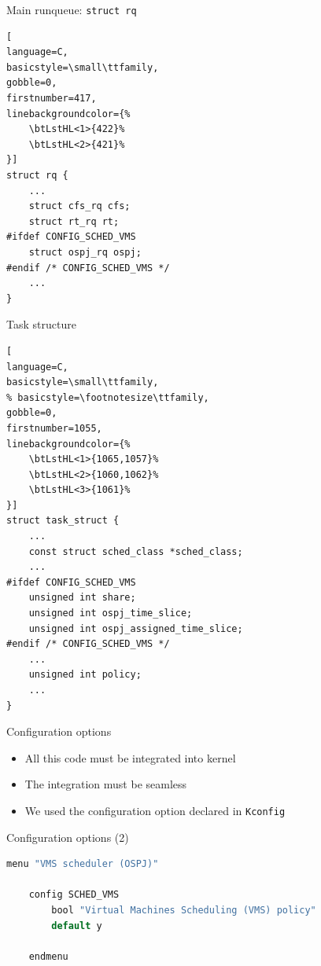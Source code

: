 \begin{frame}[fragile]{Main runqueue: \texttt{struct rq}}
\begin{lstlisting}[
language=C,
basicstyle=\small\ttfamily,
gobble=0,
firstnumber=417,
linebackgroundcolor={%
    \btLstHL<1>{422}%
    \btLstHL<2>{421}%
}]
struct rq {
    ...
    struct cfs_rq cfs;
    struct rt_rq rt;
#ifdef CONFIG_SCHED_VMS
    struct ospj_rq ospj;
#endif /* CONFIG_SCHED_VMS */
    ...
}
\end{lstlisting}
\end{frame}


\begin{frame}[fragile]{Task structure}
\begin{lstlisting}[
language=C,
basicstyle=\small\ttfamily,
% basicstyle=\footnotesize\ttfamily,
gobble=0,
firstnumber=1055,
linebackgroundcolor={%
    \btLstHL<1>{1065,1057}%
    \btLstHL<2>{1060,1062}%
    \btLstHL<3>{1061}%
}]
struct task_struct {
    ...
    const struct sched_class *sched_class;
    ...
#ifdef CONFIG_SCHED_VMS
    unsigned int share;
    unsigned int ospj_time_slice;
    unsigned int ospj_assigned_time_slice;
#endif /* CONFIG_SCHED_VMS */
    ...
    unsigned int policy;
    ...
}
\end{lstlisting}
\end{frame}

\begin{frame}{Configuration options}
    \begin{itemize}
        \item All this code must be integrated into kernel
        \item The integration must be seamless
        \item We used the configuration option declared in \texttt{Kconfig}
    \end{itemize}
\end{frame}

\begin{frame}[fragile]{Configuration options (2)}
    \begin{lstlisting}[language=C,
    gobble=4,
    language=ruby,
    firstnumber=2334,
    linebackgroundcolor={%
        \btLstHL<1>{2334,2340}%
        \btLstHL<2>{2337}%
        \btLstHL<3>{2338}%
        \btLstHL<4>{2336}%
    }
]
    menu "VMS scheduler (OSPJ)"
    
    config SCHED_VMS
        bool "Virtual Machines Scheduling (VMS) policy"
        default y

    endmenu
    \end{lstlisting}
\end{frame}

